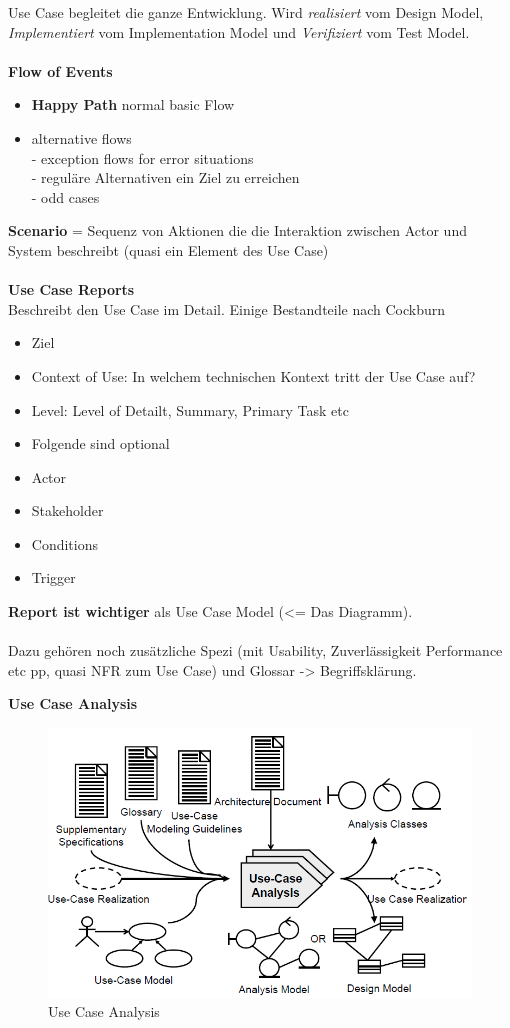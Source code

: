 Use Case begleitet die ganze Entwicklung. Wird \textit{realisiert} vom Design Model, \textit{Implementiert} vom Implementation Model und \textit{Verifiziert} vom Test Model.\\
\\
\textbf{Flow of Events}
\begin{itemize}
	\item \textbf{Happy Path} normal basic Flow
	\item alternative flows\\
	- exception flows for error situations\\
	- reguläre Alternativen ein Ziel zu erreichen\\
	- odd cases
\end{itemize}
\textbf{Scenario} = Sequenz von Aktionen die die Interaktion zwischen Actor und System beschreibt (quasi ein Element des Use Case)\\
\\
\textbf{Use Case Reports}\\
Beschreibt den Use Case im Detail. Einige Bestandteile nach Cockburn
\begin{itemize}
	\item Ziel
	\item Context of Use:  In welchem technischen Kontext tritt der Use Case auf?
	\item Level: Level of Detailt, Summary, Primary Task etc
	\item Folgende sind optional
	\item Actor
	\item Stakeholder
	\item Conditions
	\item Trigger
\end{itemize}
\textbf{Report ist wichtiger} als Use Case Model (<= Das Diagramm).
\\
\\


Dazu gehören noch zusätzliche Spezi (mit Usability, Zuverlässigkeit Performance etc pp, quasi NFR zum Use Case) und Glossar -> Begriffsklärung. 

\newpage
\textbf{Use Case Analysis}
\begin{figure}[!h]
	\centering
	\includegraphics[scale=0.4]{img/use_case_analysis.png}
	\caption{Use Case Analysis}
\end{figure}

